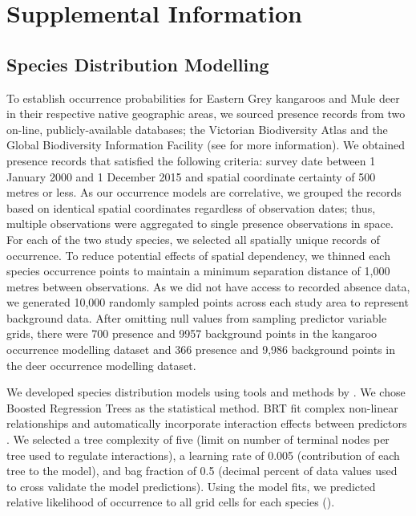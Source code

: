 \section{Supplemental Information}\label{isec:occ}

\subsection{Species Distribution Modelling}

To establish occurrence probabilities for Eastern Grey kangaroos and Mule deer in their respective native geographic areas, we sourced presence records from two on-line, publicly-available databases; the Victorian Biodiversity Atlas and the Global Biodiversity Information Facility (see  for more information). We obtained presence records that satisfied the following criteria: survey date between 1 January 2000 and 1 December 2015 and spatial coordinate certainty of 500 metres or less. As our occurrence models are correlative, we grouped the records based on identical spatial coordinates regardless of observation dates; thus, multiple observations were aggregated to single presence observations in space. For each of the two study species, we selected all spatially unique records of occurrence.  To reduce potential effects of spatial dependency, we thinned each species occurrence points to maintain a minimum separation distance of 1,000 metres between observations.  As we did not have access to recorded absence data, we generated 10,000 randomly sampled points across each study area to represent background data.  After omitting null values from sampling predictor variable grids, there were 700 presence and 9957 background points in the kangaroo occurrence modelling dataset and 366 presence and 9,986 background points in the deer occurrence modelling dataset.

We developed species distribution models using tools and methods by \cite{elit08}. We chose Boosted Regression Trees \citep[BRT, see][]{frie02} as the statistical method. BRT fit complex non-linear relationships and automatically incorporate interaction effects between predictors \citep{elit09}. We selected a tree complexity of five (limit on number of terminal nodes per tree used to regulate interactions), a learning rate of 0.005 (contribution of each tree to the model), and bag fraction of 0.5 (decimal percent of data values used to cross validate the model predictions). Using the model fits, we predicted relative likelihood of occurrence to all grid cells for each species ().

